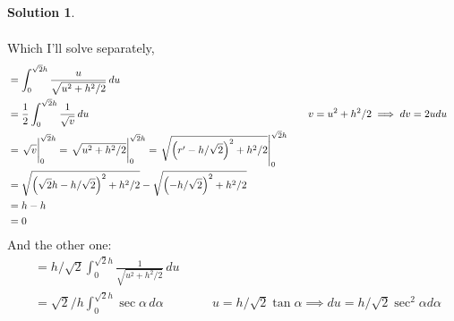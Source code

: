 \documentclass[10pt]{article}
\theoremstyle{definition}
\newtheorem{soln}{Solution}
\newcommand{\primed}[1]{{#1^\prime}}
\newcommand{\justif}[2]{&{#1}&\text{#2}}
\begin{document}
\begin{soln}
\begin{enumerate}[label=(\alph*)]
\begin{enumerate}[label=(\roman*)]
\begin{align*}
                  \end{align*}
                  Which I'll solve separately,
                  \begin{align*}
                     & =\int_{0}^{\sqrt{2}h}
                    \frac{u}{\sqrt{
                        u^2+h^2/2
                      }}
                    \,du                                                                                                                                                 \\
                     & =\frac{1}{2}\int_{0}^{\sqrt{2}h}
                    \frac{1}{\sqrt{
                        v
                      }}
                    \,du\justif{\quad}{$v=u^2+h^2/2\implies dv=2udu$}                                                                                                    \\
                     & =\eval{\sqrt{v}}_{0}^{\sqrt{2}h}=\eval{\sqrt{u^2+h^2/2}}_{0}^{\sqrt{2}h}=\eval{\sqrt{\left(\primed{r}-h/\sqrt{2}\right)^2+h^2/2}}_{0}^{\sqrt{2}h} \\
                     & =\sqrt{\left(\sqrt{2}h-h/\sqrt{2}\right)^2+h^2/2}-\sqrt{\left(-h/\sqrt{2}\right)^2+h^2/2}                                                         \\
                     & =h-h                                                                                                                                              \\
                     & =0                                                                                                                                                \\
                  \end{align*}
                  And the other one:
                  \begin{align*}
                     & =h/\sqrt{2}\int_{0}^{\sqrt{2}h}
                    \frac{1}{\sqrt{
                        u^2+h^2/2
                      }}
                    \,du                                                                                                                                                                      \\
                     & =\sqrt{2}/h\int_{0}^{\sqrt{2}h}
                    \sec\alpha
                    \,d\alpha\justif{\quad}{$u=h/\sqrt{2}\tan\alpha\implies du=h/\sqrt{2}\sec^2\alpha d\alpha$}                                                                               \\

\end{align*}
\end{enumerate}
\end{enumerate}
\end{soln}
\end{document}
